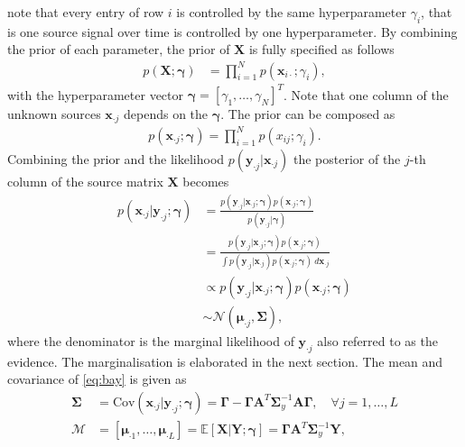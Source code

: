 note that every entry of row $i$ is controlled by the same hyperparameter $\gamma_i$, that is one source signal over time is controlled by one hyperparameter. 
By combining the prior of each parameter, the prior of $\textbf{X}$ is fully specified as follows 
\begin{align*}
p (\mathbf{X} ; \boldsymbol{\gamma}) &= \prod_{i=1}^N p (\mathbf{x}_{i \cdot} ; \gamma_i),
\end{align*}
with the hyperparameter vector $\boldsymbol{\gamma} = [\gamma_1, \dots, \gamma_N]^T$. Note that one column of the unknown sources $\textbf{x}_{\cdot j}$ depends on the $\boldsymbol{\gamma}$. The prior can be composed as 
\begin{align*}
p\left(\textbf{x}_{\cdot j};\boldsymbol{\gamma}\right) = \prod_{i=1}^{N}p\left( x_{ij};\gamma_{i}\right).
\end{align*} 
Combining the prior and the likelihood $p(\mathbf{y}_{\cdot j} \vert \mathbf{x}_{\cdot j})$  the posterior of the $j$-th column of the source matrix $\mathbf{X}$ becomes
\begin{align}
p(\mathbf{x}_{\cdot j} \vert \mathbf{y}_{\cdot j} ; \boldsymbol{\gamma}) &= \frac{p(\mathbf{y}_{\cdot j} | \mathbf{x}_{\cdot j} ; \boldsymbol{\gamma}) p(\mathbf{x}_{\cdot j} ; \boldsymbol{\gamma})}{p(\mathbf{y}_{\cdot j} | \boldsymbol{\gamma})} \nonumber \\
&= \frac{p(\mathbf{y}_{\cdot j} | \mathbf{x}_{\cdot j} ; \boldsymbol{\gamma}) p(\mathbf{x}_{\cdot j} ; \boldsymbol{\gamma})}{\int p(\mathbf{y}_{\cdot j} | \mathbf{x}_{\cdot j}) p(\mathbf{x}_{\cdot j} ; \boldsymbol{\gamma}) \ d \mathbf{x}_{\cdot j}} \nonumber \\ 
&\propto p(\mathbf{y}_{\cdot j} | \mathbf{x}_{\cdot j} ; \boldsymbol{\gamma}) p(\mathbf{x}_{\cdot j} ; \boldsymbol{\gamma})\\
&\sim \mathcal{N}(\boldsymbol{\mu}_{\cdot j}, \boldsymbol{\Sigma}),\label{eq:bay}
\end{align}
where the denominator is the marginal likelihood of $\mathbf{y}_{\cdot j}$ also referred to as the evidence. The marginalisation is elaborated in the next section. The mean and covariance of \eqref{eq:bay} is given as
\begin{align}
\boldsymbol{\Sigma} &= \text{Cov}(\mathbf{x}_{\cdot j} \vert \mathbf{y}_{\cdot j} ; \boldsymbol{\gamma}) = \boldsymbol{\Gamma} - \boldsymbol{\Gamma} \mathbf{A}^T \boldsymbol{\Sigma}_y^{-1} \mathbf{A} \boldsymbol{\Gamma}, \quad \forall j = 1, \dots, L \label{eq:moments1} \\
\mathcal{M} &= [\boldsymbol{\mu}_{\cdot 1}, \dots, \boldsymbol{\mu}_{\cdot L}] = \mathbb{E}[\mathbf{X} \vert \mathbf{Y} ; \boldsymbol{\gamma}] = \boldsymbol{\Gamma} \mathbf{A}^T \boldsymbol{\Sigma}_y^{-1} \mathbf{Y}, \label{eq:moments2} 
\end{align}
